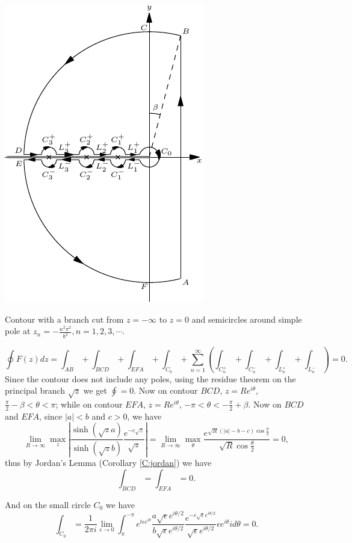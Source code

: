 \begin{marginfigure} 
  \includegraphics{graphics/contour_sinh.pdf}
	\caption{Contour with a branch cut from $z=-\infty$ to $z=0$ and semicircles
		around simple pole at $z_n=-\frac{n^2 \pi^2}{b^2}, n=1,2,3,\cdots$.}
\end{marginfigure}

\[
	\oint F(z) dz 
	= \int_{AB} + \int_{BCD} + \int_{EFA} + \int_{C_0} 
	+ \sum_{n=1}^{\infty} 
	  \left( 
			\int_{C_n^+} + \int_{C_n^-} + \int_{L_n^+} + \int_{L_n^-} 
		\right)
 =0.
\]
Since the contour does not include any poles, using the residue theorem on the
principal branch $\sqrt{z}$ we get $\oint =0$. Now on contour $BCD$, 
$z=R e^{i\theta}$, $\frac{\pi}{2}-\beta <\theta <\pi$; while on contour $EFA$, 
$z=R e^{i\theta}$, $-\pi <\theta < -\frac{\pi}{2}+\beta$. Now on $BCD$ and
$EFA$, since $|a|<b$ and $c>0$, we have
\[
	\lim_{R\to\infty} \max_z 
	\left| 
	  \frac{\sinh(\sqrt{z} a)}{\sinh (\sqrt{z} b)} \frac{e^{-c\sqrt{z}}}{\sqrt{z}}
	\right|
	= \lim_{R\to\infty} \max_{\theta} 
	\frac{ e^{\sqrt{R} (|a|-b-c) \cos\frac{\theta}{2}} }
	     { \sqrt{R}\cos\frac{\theta}{2} }
	=0,
\]
thus by Jordan's Lemma (Corollary \ref{C:jordan}) we have 
\[
	\int_{BCD}=\int_{EFA}=0.
\]

And on the small circle $C_0$ we have
\[
	\int_{C_0} = \frac{1}{2\pi i} 
	  \lim_{\epsilon\to 0} \int_{\pi}^{-\pi} e^{t\epsilon e^{i\theta}}
		\frac{a\sqrt{\epsilon}e^{i\theta/2}}{b\sqrt{\epsilon}e^{i\theta/2}}
		\frac{e^{-c\sqrt{\epsilon}e^{i\theta/2}}}{\sqrt{\epsilon} e^{i\theta/2}}
		\epsilon e^{i\theta} i d\theta
	=0.
\]

